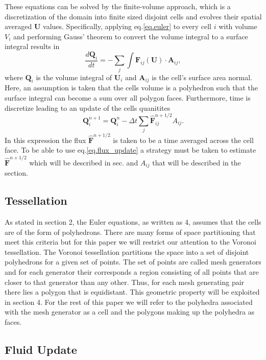 These equations can be solved by the finite-volume approach, which is a discretization
of the domain into finite sized disjoint cells and evolves their spatial averaged
$\mathbf{U}$ values. Specifically, applying eq.\ref{eq.euler} to every cell $i$ with
volume $V_i$ and performing Gauss' theorem to convert the volume integral to a
surface integral results in
%
\begin{equation}
    \label{eq.euler_int}
    \frac{d\mathbf{Q}_i}{dt} =
    -\sum_{j}\int\mathbf{F}_{ij}(\mathbf{U})\cdot\mathbf{A}_{ij},
\end{equation}
%
where $\mathbf{Q}_i$ is the volume integral of $\mathbf{U}_i$ and $\mathbf{A}_{ij}$ is the
cell's surface area normal. Here, an assumption is taken that the cells volume is a polyhedron
such that the surface integral can become a sum over all polygon faces. Furthermore, time
is discretize leading to an update of the cells quanitites
%
\begin{equation}
    \label{eq.flux_update}
    \mathbf{Q}_i^{n+1} = \mathbf{Q}_i^n - \Delta t\sum_j \mathbf{\hat{F}}_{ij}^{n+1/2} A_{ij}.
\end{equation}
%
In this expression the flux $\mathbf{\hat{F}}^{n+1/2}$ is taken to be a time averaged across
the cell face. To be able to use eq.\ref{eq.flux_update} a strategy must be taken to estimate
$\mathbf{\hat{F}}^{n+1/2}$ which will be described in sec. and $A_{ij}$ that will be described
in the section.

\subsection{Tessellation}
As stated in section 2, the Euler equations, as written as 4, assumes that the cells are of the
form of polyhedrons. There are many forms of space partitioning that meet this criteria but for
this paper we will restrict our attention to the Voronoi tessellation. The Voronoi tessellation
partitions the space into a set of disjoint polyhedrons for a given set of points. The set of
points are called mesh generators and for each generator their corresponds a region consisting of
all points that are closer to that generator than any other. Thus, for each mesh generating pair
there lies a polygon that is equidistant. This geometric property will be exploited in section 4.
For the rest of this paper we will refer to the polyhedra associated with the mesh generator as 
a cell and the polygons making up the polyhedra as faces.

\subsection{Fluid Update}
